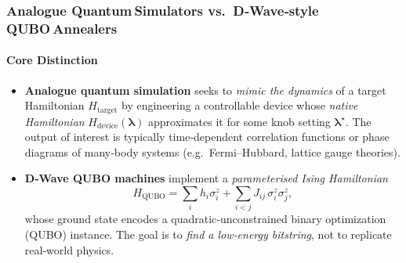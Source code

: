 \documentclass[11pt,a4paper]{article}
\begin{document}
\subsubsection{Analogue Quantum Simulators vs.\ D‑Wave‐style QUBO Annealers}

\paragraph{Core Distinction}
\begin{itemize}
	\item \textbf{Analogue quantum simulation} seeks to \emph{mimic the dynamics} of a target Hamiltonian $H_{\text{target}}$ by engineering a controllable device whose \emph{native Hamiltonian} $H_{\text{device}}(\boldsymbol{\lambda})$ approximates it for some knob setting $\boldsymbol{\lambda}^\star$.  The output of interest is typically time‑dependent correlation functions or phase diagrams of many‑body systems (e.g.\ Fermi–Hubbard, lattice gauge theories).
	\item \textbf{D‑Wave QUBO machines} implement a \emph{parameterised Ising Hamiltonian}
	\[
	H_{\text{QUBO}} = \sum_i h_i \sigma_i^z + \sum_{i<j} J_{ij}\,\sigma_i^z\sigma_j^z,
	\]
	whose ground state encodes a quadratic‐unconstrained binary optimization (QUBO) instance.  The goal is to \emph{find a low‑energy bitstring}, not to replicate real‑world physics.
\end{itemize}
\end{document}
